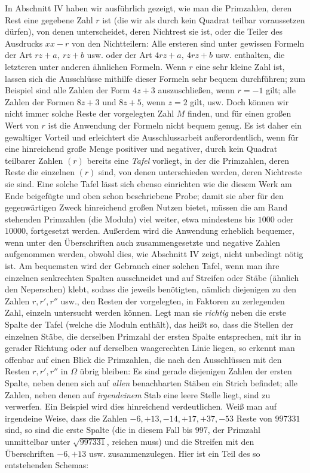 In Abschnitt IV haben wir ausführlich gezeigt, wie man die Primzahlen, deren Rest eine gegebene Zahl \(r\) ist (die wir als durch kein Quadrat teilbar voraussetzen dürfen), von denen unterscheidet, deren Nichtrest sie ist, oder die Teiler des Ausdrucks \(xx-r\) von den Nichtteilern: Alle ersteren sind unter gewissen Formeln der Art \(rz+a,\allowbreak \ rz+b\) usw. oder der Art \(4rz+a,\allowbreak \ 4rz+b\) usw. enthalten, die letzteren unter anderen ähnlichen Formeln. Wenn \(r\) eine sehr kleine Zahl ist, lassen sich die Ausschlüsse mithilfe dieser Formeln
sehr bequem durchführen; zum Beispiel sind alle Zahlen der Form \(4z+3\) auszuschließen, wenn \(r=-1\) gilt; alle Zahlen der Formen \(8z+3\) und \(8z+5\), wenn \(z=2\) gilt, usw. Doch können wir nicht immer solche Reste der vorgelegten Zahl \(M\) finden, und für einen großen Wert von \(r\) ist die Anwendung der Formeln nicht bequem genug. Es ist daher ein gewaltiger Vorteil und erleichtert die Ausschlussarbeit außerordentlich, wenn für eine hinreichend große Menge positiver und negativer, durch kein Quadrat teilbarer Zahlen \((r)\) bereits eine \textit{Tafel} vorliegt, in der die Primzahlen, deren Reste die einzelnen \((r)\) sind, von denen unterschieden werden, deren Nichtreste sie sind. Eine solche Tafel lässt sich ebenso einrichten wie die diesem Werk am Ende beigefügte und oben schon beschriebene Probe; damit sie aber für den gegenwärtigen Zweck hinreichend großen Nutzen bietet, müssen die am Rand stehenden Primzahlen (die Moduln) viel weiter, etwa mindestens bis \(1000\) oder \(10000\), fortgesetzt werden. Außerdem wird die Anwendung erheblich bequemer, wenn unter den Überschriften auch zusammengesetzte und negative Zahlen aufgenommen werden, obwohl dies, wie Abschnitt IV zeigt, nicht unbedingt nötig ist. Am bequemsten wird der Gebrauch einer solchen Tafel, wenn man ihre einzelnen senkrechten Spalten ausschneidet und auf Streifen oder Stäbe (ähnlich den Neperschen) klebt, sodass die jeweils benötigten, nämlich diejenigen zu den Zahlen \(r,\allowbreak r',\allowbreak r''\) usw., den Resten der vorgelegten, in Faktoren zu zerlegenden Zahl, einzeln untersucht werden können. Legt man sie \textit{richtig} neben die erste Spalte der Tafel (welche die Moduln enthält), das heißt so, dass die Stellen der einzelnen Stäbe, die derselben Primzahl der ersten Spalte entsprechen, mit ihr in gerader Richtung oder auf derselben waagerechten Linie liegen, so erkennt man offenbar auf einen Blick die Primzahlen, die nach den Ausschlüssen mit den Resten \(r,\allowbreak r',\allowbreak r''\) in \(\Omega\) übrig bleiben: Es sind gerade diejenigen Zahlen der ersten Spalte, neben denen sich auf \textit{allen} benachbarten Stäben ein Strich befindet; alle Zahlen, neben denen auf \textit{irgendeinem} Stab eine leere Stelle liegt, sind zu verwerfen. Ein Beispiel wird dies hinreichend verdeutlichen. Weiß man auf irgendeine Weise, dass die Zahlen \(-6,\allowbreak +13,\allowbreak -14,\allowbreak +17,\allowbreak +37,\allowbreak -53\) Reste von \(997331\) sind, so sind die erste Spalte (die in diesem Fall bis \(997\), der Primzahl unmittelbar unter \(\surd{997331}\), reichen muss) und die Streifen mit den Überschriften \(-6,\allowbreak +13\) usw. zusammenzulegen. Hier ist ein Teil des so entstehenden Schemas:
